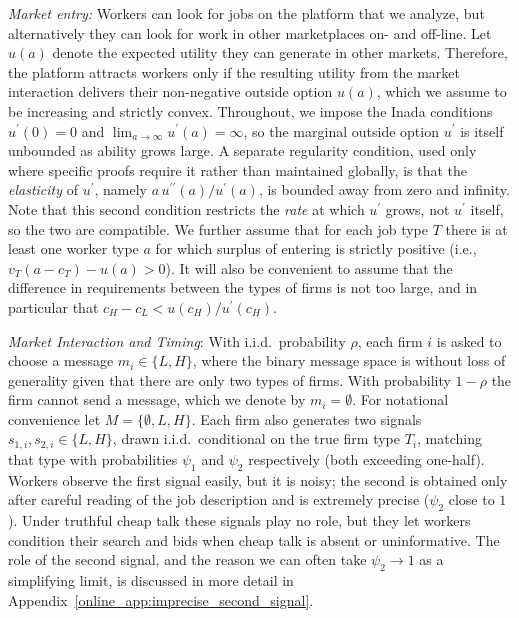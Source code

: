 \documentclass[12pt]{article}
\begin{document}
\textit{Market entry:} Workers can look for jobs on the platform that we analyze, but alternatively they can look for work in other marketplaces on- and off-line. Let $u(a)$ denote the expected utility they can generate in other markets. Therefore, the platform attracts workers only if the resulting utility from the market interaction delivers their non-negative outside option $u(a)$, which we assume to be increasing and strictly convex. Throughout, we impose the Inada conditions $u^{\prime }(0)=0$ and $\lim_{a\to\infty}u^{\prime }(a)=\infty$, so the marginal outside option $u^{\prime}$ is itself unbounded as ability grows large. A separate regularity condition, used only where specific proofs require it rather than maintained globally, is that the \emph{elasticity} of $u^{\prime }$, namely $a\, u^{\prime \prime}(a)/u^{\prime }(a)$, is bounded away from zero and infinity. Note that this second condition restricts the \emph{rate} at which $u^{\prime}$ grows, not $u^{\prime}$ itself, so the two are compatible. We further assume that for each job type $T$ there is at least one worker type $a$ for which surplus of entering is strictly positive (i.e., $v_{T}(a-c_{T})-u\left( a\right) >0$). It will also be convenient to assume that the difference in requirements between the types of firms is not too large, and in particular that $c_{H}-c_{L}<u(c_{H})/u^{\prime }(c_{H}).$


\textit{Market Interaction and Timing}: With i.i.d.\ probability $\rho$, each firm $i$ is asked to choose a message $m_{i}\in\{L,H\}$, where the binary message space is without loss of generality given that there are only two types of firms. With probability $1-\rho$ the firm cannot send a message, which we denote by $m_{i}=\emptyset$. For notational convenience let $M=\{\emptyset,L,H\}$. Each firm also generates two signals $s_{1,i},s_{2,i}\in\{L,H\}$, drawn i.i.d.\ conditional on the true firm type $T_{i}$, matching that type with probabilities $\psi_{1}$ and $\psi_{2}$ respectively (both exceeding one-half). Workers observe the first signal easily, but it is noisy; the second is obtained only after careful reading of the job description and is extremely precise ($\psi_{2}$ close to $1$). Under truthful cheap talk these signals play no role, but they let workers condition their search and bids when cheap talk is absent or uninformative. The role of the second signal, and the reason we can often take $\psi_{2}\to 1$ as a simplifying limit, is discussed in more detail in Appendix~\ref{online_app:imprecise_second_signal}.
\end{document}
